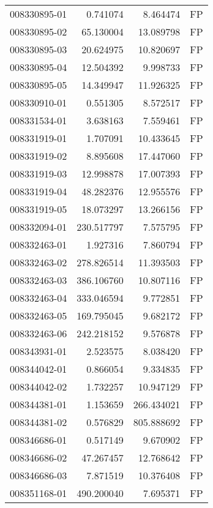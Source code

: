 \begin{tabular}{lrrl}
008330895-01 &    0.741074 &       8.464474 &   FP \\
008330895-02 &   65.130004 &      13.089798 &   FP \\
008330895-03 &   20.624975 &      10.820697 &   FP \\
008330895-04 &   12.504392 &       9.998733 &   FP \\
008330895-05 &   14.349947 &      11.926325 &   FP \\
008330910-01 &    0.551305 &       8.572517 &   FP \\
008331534-01 &    3.638163 &       7.559461 &   FP \\
008331919-01 &    1.707091 &      10.433645 &   FP \\
008331919-02 &    8.895608 &      17.447060 &   FP \\
008331919-03 &   12.998878 &      17.007393 &   FP \\
008331919-04 &   48.282376 &      12.955576 &   FP \\
008331919-05 &   18.073297 &      13.266156 &   FP \\
008332094-01 &  230.517797 &       7.575795 &   FP \\
008332463-01 &    1.927316 &       7.860794 &   FP \\
008332463-02 &  278.826514 &      11.393503 &   FP \\
008332463-03 &  386.106760 &      10.807116 &   FP \\
008332463-04 &  333.046594 &       9.772851 &   FP \\
008332463-05 &  169.795045 &       9.682172 &   FP \\
008332463-06 &  242.218152 &       9.576878 &   FP \\
008343931-01 &    2.523575 &       8.038420 &   FP \\
008344042-01 &    0.866054 &       9.334835 &   FP \\
008344042-02 &    1.732257 &      10.947129 &   FP \\
008344381-01 &    1.153659 &     266.434021 &   FP \\
008344381-02 &    0.576829 &     805.888692 &   FP \\
008346686-01 &    0.517149 &       9.670902 &   FP \\
008346686-02 &   47.267457 &      12.768642 &   FP \\
008346686-03 &    7.871519 &      10.376408 &   FP \\
008351168-01 &  490.200040 &       7.695371 &   FP \\

\end{tabular}
